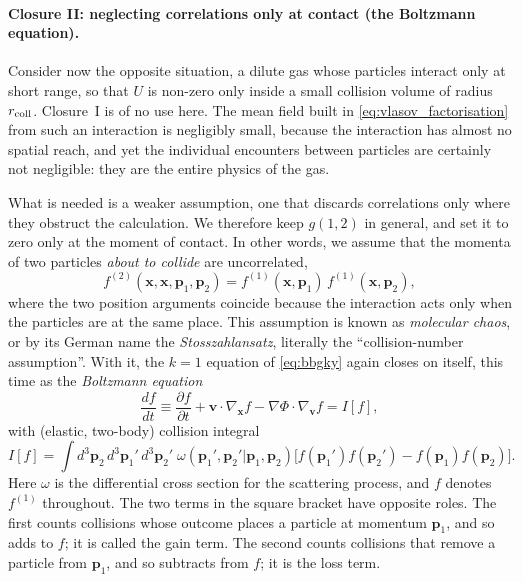 \documentclass[12pt]{article}
\renewcommand{\vec}[1]{\bm{#1}}
\begin{document}
\paragraph{Closure II: neglecting correlations only at contact
(the Boltzmann equation).}  Consider now the opposite situation, a
dilute gas whose particles interact only at short range, so that $U$ is
non-zero only inside a small collision volume of radius
$r_{\rm coll}$.  Closure~I is of no use here.  The mean field built in
\eqref{eq:vlasov_factorisation} from such an interaction is negligibly
small, because the interaction has almost no spatial reach, and yet the
individual encounters between particles are certainly not negligible:
they are the entire physics of the gas.

What is needed is a weaker assumption, one that discards correlations
only where they obstruct the calculation.  We therefore keep $g(1,2)$
in general, and set it to zero only at the moment of contact.  In other
words, we assume that the momenta of two particles \emph{about to
collide} are uncorrelated,
%
\begin{equation}
  f^{(2)}(\vec x,\vec x,\vec p_1,\vec p_2)
   = f^{(1)}(\vec x,\vec p_1)\,f^{(1)}(\vec x,\vec p_2),
  \label{eq:stosszahlansatz}
\end{equation}
%
where the two position arguments coincide because the interaction acts
only when the particles are at the same place.  This assumption is
known as \emph{molecular chaos}, or by its German name the
\emph{Stosszahlansatz}, literally the ``collision-number assumption''.
With it, the $k=1$ equation of \eqref{eq:bbgky} again closes on itself,
this time as the \emph{Boltzmann equation}
%
\begin{equation}
  \frac{df}{dt}
   \equiv \frac{\partial f}{\partial t}
        + \vec v\cdot\nabla_{\!\vec x} f
        - \nabla\Phi\cdot\nabla_{\!\vec v} f
   = I[f],
  \label{eq:boltzmann}
\end{equation}
%
with (elastic, two-body) collision integral
%
\begin{equation}
  I[f] = \!\int\! d^3\vec p_2\,d^3\vec p_1'\,d^3\vec p_2'\;
    \omega(\vec p_1',\vec p_2'|\vec p_1,\vec p_2)
    \bigl[f(\vec p_1')f(\vec p_2') - f(\vec p_1)f(\vec p_2)\bigr].
  \label{eq:collision_integral}
\end{equation}
%
Here $\omega$ is the differential cross section for the scattering
process, and $f$ denotes $f^{(1)}$ throughout.  The two terms in the
square bracket have opposite roles.  The first counts collisions whose
outcome places a particle at momentum $\vec p_1$, and so adds to $f$;
it is called the gain term.  The second counts collisions that remove a
particle from $\vec p_1$, and so subtracts from $f$; it is the loss
term.
\end{document}
